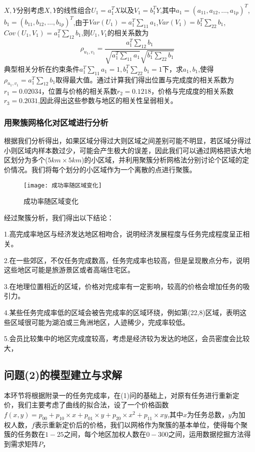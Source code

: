 \documentclass{ctexart}
\begin{document}
$X,Y$分别考虑$X,Y$的线性组合$U_1=a^{T}_{1}X$以及$V_1=b^{T}_{1}Y$,其中$a_1=(a_{11},a_{12},\dots,a_{1p})^T$,$b_1=(b_{11},b_{12},\dots,b_{1p})^T$,由于$Var(U_1)=a_{1}^{T}\sum_{11} a_1$,$Var(V_1)=b_{1}^{T}\sum_{22} b_1$,$Cov(U_1,V_1)=a_{1}^{T}\sum_{12} b_1$,则$U_1,V_1$的相关系数为$$\rho_{u_1,v_1}=\frac{a_{1}^{T}\sum_{12} b_1}{\sqrt{a_{1}^{T}\sum_{11} a_1} \sqrt{b_{1}^{T}\sum_{22} b_1}}$$
典型相关分析在约束条件$a_{1}^{T}\sum_{11} a_1=1,b_{1}^{T}\sum_{22} b_1=1$下，求$a_1,b_1$,使得
$\rho_{u_1,v_1}={a_{1}^{T}\sum_{12} b_1}$取得最大值。通过计算我们得出位置与完成度的相关系数为$r_1=0.02034$，位置与价格的相关系数$r_2=0.1218$，价格与完成度的相关系数$r_3=0.2031$,因此得出这些参数与地区的相关性呈弱相关。
\subsubsection{用聚簇网格化对区域进行分析}
根据我们分析得出，如果区域分得过大则区域之间差别可能不明显，若区域分得过小则区域内样本数过少，可能会产生极大的误差，因此我们可以通过网格把该大地区划分为多个($5km\times5km$)的小区域，并利用聚簇分析网格法分别讨论个区域的定价情况。我们将每个划分的小区域作为一个离散的点进行聚簇。


\begin{figure}[htbp] 
\centering
\texttt{[image: 成功率随区域变化]} 
\caption{成功率随区域变化}
\end{figure}
\newpage
经过聚簇分析，我们得出以下结论：

1.高完成率地区与经济发达地区相吻合，说明经济发展程度与任务完成程度呈正相关。

2.在一些郊区，不仅任务完成数高，任务完成率也较高，但是呈现散点分布，说明这些地区可能是旅游景区或者高端住宅区。

3.在地理位置相近的区域，价格对完成率有一定影响，较高的价格会增加任务的吸引力。

4.某些任务完成率低的区域会被告完成率的区域环绕，例如第(22,8)区域，表明这些区域很可能为湖泊或三角洲地区，人迹稀少，完成率较低。

5.会员比较集中的地区完成度较高，考虑是经济较为发达的地区，会员密度会比较大，


\subsection{问题(2)的模型建立与求解}
本环节将根据附录一的任务完成率，在(1)问的基础上，对原有任务进行重新定价，我们主要考虑了曲线的拟合法，设了一个价格函数$f(x,y)=p_{00}+p_{10}\times x+ p_{01}\times y+p_{20}\times x^2+p_{11}\times xy$,其中$x$为任务总数，$y$为加权人数，$f$表示重新定价后的价格，我们以网格作为聚簇的基本单位，使得每个聚簇的任务数在$1-25$之间，每个地区加权人数在$0-300$之间，运用数据挖掘方法得到需求矩阵$P$，
\end{document}
